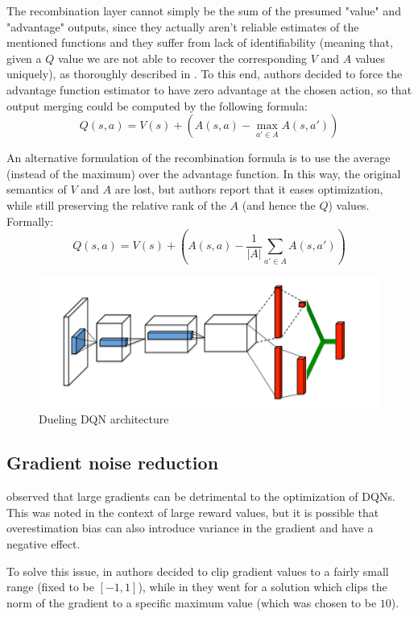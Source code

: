 \documentclass[a4paper,10pt]{report}
\begin{document}
The recombination layer cannot simply be the sum of the presumed "value" and "advantage" outputs, since they actually aren't reliable estimates of the mentioned functions and they suffer from lack of identifiability (meaning that, given a $Q$ value we are not able to recover the corresponding $V$ and $A$ values uniquely), as thoroughly described in \cite{dueling-dqn}. To this end, authors decided to force the advantage function estimator to have zero advantage at the
chosen action, so that output merging could be computed by the following formula:
$$
Q(s,a)=V(s) + \left(A(s,a) - \max_{a'\in A}A(s,a')\right)
$$

An alternative formulation of the recombination formula is to use the average (instead of the maximum) over the advantage function. In this way, the original semantics of $V$ and $A$ are lost, but authors report that it eases optimization, while still preserving the relative rank of the $A$ (and hence the $Q$) values. Formally:
$$
Q(s,a)=V(s) + \left(A(s,a) - \frac{1}{|A|}\sum_{a'\in A}A(s,a')\right)
$$

\begin{figure}[h]
	\includegraphics[width=\textwidth]{dueling-dqn.png}
	\caption{Dueling DQN architecture}
	\label{fig:dueling-dqn}
\end{figure}

\subsection{Gradient noise reduction}
\citeauthor{atari-dqn} observed that large gradients can be detrimental to the optimization of DQNs. This was noted in the context of large reward values, but it is possible that overestimation bias can also introduce variance in the gradient and have a negative effect.

To solve this issue, in \cite{atari-dqn} authors decided to clip gradient values to a fairly small range (fixed to be $[-1,1]$), while in \cite{per} they went for a solution which clips the norm of the gradient to a specific maximum value (which was chosen to be $10$).
\end{document}
